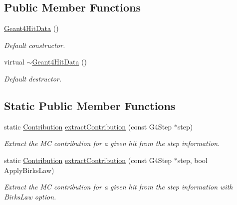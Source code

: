 \subsection*{Public Member Functions}
\begin{DoxyCompactItemize}
\item 
\hyperlink{class_d_d4hep_1_1_simulation_1_1_geant4_hit_data_a720c9f6193739b3ce4f23c321a4af1be}{Geant4\+Hit\+Data} ()
\begin{DoxyCompactList}\small\item\em Default constructor. \end{DoxyCompactList}\item 
virtual \hyperlink{class_d_d4hep_1_1_simulation_1_1_geant4_hit_data_a57540b8795c4a198a0925773269d99f3}{$\sim$\+Geant4\+Hit\+Data} ()
\begin{DoxyCompactList}\small\item\em Default destructor. \end{DoxyCompactList}\end{DoxyCompactItemize}
\subsection*{Static Public Member Functions}
\begin{DoxyCompactItemize}
\item 
static \hyperlink{class_d_d4hep_1_1_simulation_1_1_geant4_hit_data_aec2f53237eac2db7d83dd03bca8719c5}{Contribution} \hyperlink{class_d_d4hep_1_1_simulation_1_1_geant4_hit_data_aa05fcd729fd401c61e2fa7a48887efc5}{extract\+Contribution} (const G4\+Step $\ast$step)
\begin{DoxyCompactList}\small\item\em Extract the MC contribution for a given hit from the step information. \end{DoxyCompactList}\item 
static \hyperlink{class_d_d4hep_1_1_simulation_1_1_geant4_hit_data_aec2f53237eac2db7d83dd03bca8719c5}{Contribution} \hyperlink{class_d_d4hep_1_1_simulation_1_1_geant4_hit_data_a53b06813612ad68f26dc3ad1ca2662b3}{extract\+Contribution} (const G4\+Step $\ast$step, bool Apply\+Birks\+Law)
\begin{DoxyCompactList}\small\item\em Extract the MC contribution for a given hit from the step information with Birks\+Law option. \end{DoxyCompactList}\end{DoxyCompactItemize}
